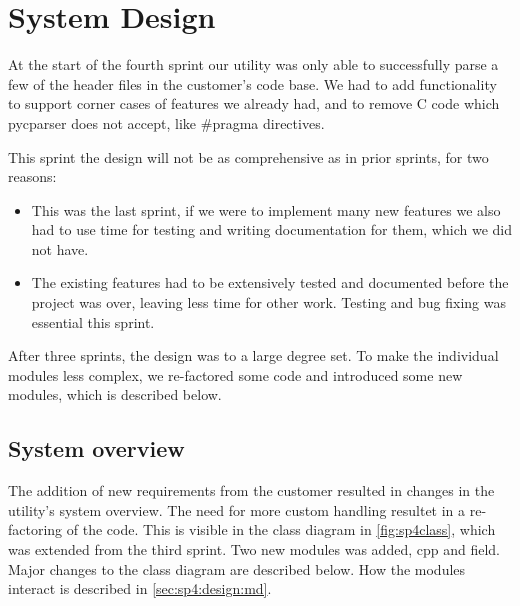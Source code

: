 \section{System Design}
\label{sec:sp4:design}

At the start of the fourth sprint our utility was only able to successfully
parse a few of the header files in the customer's code base. We had to add
functionality to support corner cases of features we already had, and to
remove C code which \gls{pycparser} does not accept, like \#pragma directives.

This sprint the design will not be as comprehensive as in prior sprints, for two reasons:
\begin{itemize}
	\item This was the last sprint, if we were to implement many new features we also had to use time for testing and writing documentation for them, which we did not have.
	\item The existing features had to be extensively tested and documented before the project was over, leaving less time for other work. Testing and bug fixing was essential this sprint.
\end{itemize}
After three sprints, the design was to a large degree set. To make the
individual modules less complex, we re-factored some code and introduced
some new modules, which is described below.

\subsection{System overview}
The addition of new requirements from the customer resulted in changes in the utility's system overview. The need for more custom handling resultet in a re-factoring of the code. This is visible in the class diagram in \autoref{fig:sp4class}, which was extended from the third sprint. Two new modules was added, cpp and field. Major changes to the class diagram are described below. How the modules interact is described in \autoref{sec:sp4:design:md}.

